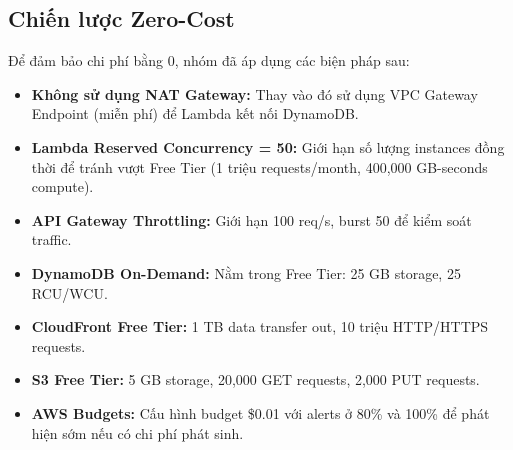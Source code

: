 \subsection{Chiến lược Zero-Cost}
\label{ssec:zero_cost}

Để đảm bảo chi phí bằng 0, nhóm đã áp dụng các biện pháp sau:

\begin{itemize}
    \item \textbf{Không sử dụng NAT Gateway:} Thay vào đó sử dụng VPC Gateway Endpoint (miễn phí) để Lambda kết nối DynamoDB.
    
    \item \textbf{Lambda Reserved Concurrency = 50:} Giới hạn số lượng instances đồng thời để tránh vượt Free Tier (1 triệu requests/month, 400,000 GB-seconds compute).
    
    \item \textbf{API Gateway Throttling:} Giới hạn 100 req/s, burst 50 để kiểm soát traffic.
    
    \item \textbf{DynamoDB On-Demand:} Nằm trong Free Tier: 25 GB storage, 25 RCU/WCU.
    
    \item \textbf{CloudFront Free Tier:} 1 TB data transfer out, 10 triệu HTTP/HTTPS requests.
    
    \item \textbf{S3 Free Tier:} 5 GB storage, 20,000 GET requests, 2,000 PUT requests.
    
    \item \textbf{AWS Budgets:} Cấu hình budget \$0.01 với alerts ở 80\% và 100\% để phát hiện sớm nếu có chi phí phát sinh.
\end{itemize}
